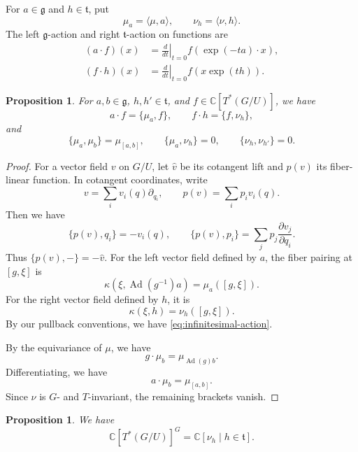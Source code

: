 \documentclass[12pt]{article}
\theoremstyle{paperplain}
\newtheorem{proposition}[theorem]{Proposition}
\theoremstyle{paperdefinition}
\DeclareMathOperator{\Ad}{Ad}
\newcommand{\C}{\mathbb C}
\newcommand{\g}{\mathfrak g}
\newcommand{\tfrak}{\mathfrak t}
\begin{document}
For $a\in\g$ and $h\in\tfrak$, put
$$
    \mu_a=\langle\mu,a\rangle,\qquad
    \nu_h=\langle\nu,h\rangle.
$$
The left $\g$-action and right $\tfrak$-action on functions are
\begin{align*}
    (a\cdot f)(x)
    &=\left.\frac{d}{dt}\right|_{t=0}f(\exp(-ta)\cdot x),\\
    (f\cdot h)(x)
    &=\left.\frac{d}{dt}\right|_{t=0}f(x\exp(th)).
\end{align*}

\begin{proposition}\label{prop:infinitesimal-actions}\label{prop:moment-brackets}
    For $a,b\in\g$, $h,h'\in\tfrak$, and $f\in\C[T^*(G/U)]$, we have
    \begin{equation}\label{eq:infinitesimal-action}
        a\cdot f=\{\mu_a,f\},\qquad
        f\cdot h=\{f,\nu_h\},
    \end{equation}
    and
    \begin{equation}\label{eq:moment-brackets}
        \{\mu_a,\mu_b\}=\mu_{[a,b]},\qquad
        \{\mu_a,\nu_h\}=0,\qquad
        \{\nu_h,\nu_{h'}\}=0.
    \end{equation}
\end{proposition}

\begin{proof}
    For a vector field $v$ on $G/U$, let $\widehat v$ be its cotangent lift and $p(v)$ its fiber-linear function. In cotangent coordinates, write
    $$
        v=\sum_i v_i(q)\partial_{q_i},\qquad
        p(v)=\sum_i p_iv_i(q).
    $$
    Then we have
    $$
        \{p(v),q_i\}=-v_i(q),\qquad
        \{p(v),p_i\}=\sum_j p_j\frac{\partial v_j}{\partial q_i}.
    $$
    Thus $\{p(v),-\}=-\widehat v$. For the left vector field defined by $a$, the fiber pairing at $[g,\xi]$ is
    $$
        \kappa(\xi,\Ad(g^{-1})a)=\mu_a([g,\xi]).
    $$
    For the right vector field defined by $h$, it is
    $$
        \kappa(\xi,h)=\nu_h([g,\xi]).
    $$
    By our pullback conventions, we have \eqref{eq:infinitesimal-action}.

    By the equivariance of $\mu$, we have
    $$
        g\cdot\mu_b=\mu_{\Ad(g)b}.
    $$
    Differentiating, we have
    $$
        a\cdot\mu_b=\mu_{[a,b]}.
    $$
    Since $\nu$ is $G$- and $T$-invariant, the remaining brackets vanish.
\end{proof}

\begin{proposition}\label{prop:G-invariants}
    We have
    $$
        \C[T^*(G/U)]^G=\C[\nu_h\mid h\in\tfrak].
    $$
\end{proposition}
\end{document}
